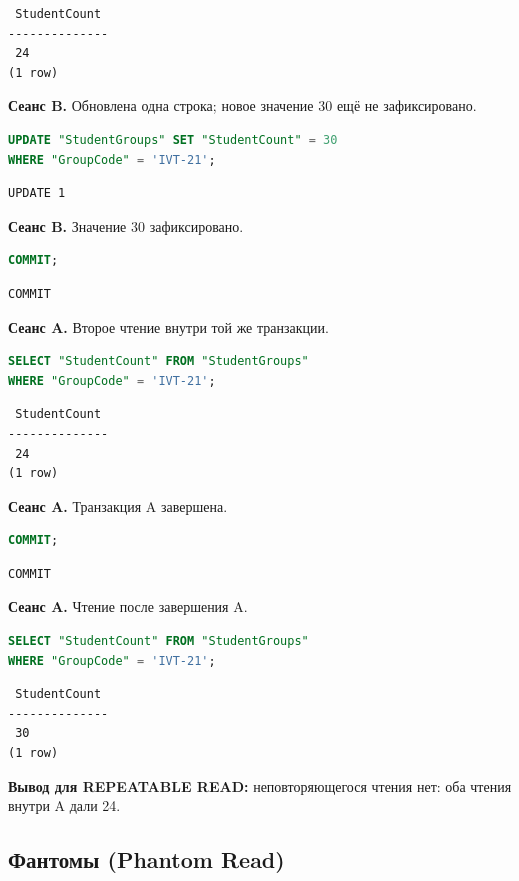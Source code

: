 \documentclass[12pt,a4paper]{article}
\begin{document}
\begin{lstlisting}
 StudentCount
--------------
 24
(1 row)
\end{lstlisting}

\textbf{Сеанс B.} Обновлена одна строка; новое значение 30 ещё не зафиксировано.
\begin{lstlisting}[language=SQL]
UPDATE "StudentGroups" SET "StudentCount" = 30
WHERE "GroupCode" = 'IVT-21';
\end{lstlisting}

\begin{lstlisting}
UPDATE 1
\end{lstlisting}

\textbf{Сеанс B.} Значение 30 зафиксировано.
\begin{lstlisting}[language=SQL]
COMMIT;
\end{lstlisting}

\begin{lstlisting}
COMMIT
\end{lstlisting}

\textbf{Сеанс A.} Второе чтение внутри той же транзакции.
\begin{lstlisting}[language=SQL]
SELECT "StudentCount" FROM "StudentGroups"
WHERE "GroupCode" = 'IVT-21';
\end{lstlisting}

\begin{lstlisting}
 StudentCount
--------------
 24
(1 row)
\end{lstlisting}

\textbf{Сеанс A.} Транзакция A завершена.
\begin{lstlisting}[language=SQL]
COMMIT;
\end{lstlisting}

\begin{lstlisting}
COMMIT
\end{lstlisting}

\textbf{Сеанс A.} Чтение после завершения A.
\begin{lstlisting}[language=SQL]
SELECT "StudentCount" FROM "StudentGroups"
WHERE "GroupCode" = 'IVT-21';
\end{lstlisting}

\begin{lstlisting}
 StudentCount
--------------
 30
(1 row)
\end{lstlisting}

\textbf{Вывод для REPEATABLE READ:} неповторяющегося чтения нет: оба чтения внутри A дали 24.

\subsection*{Фантомы (Phantom Read)}
\end{document}
